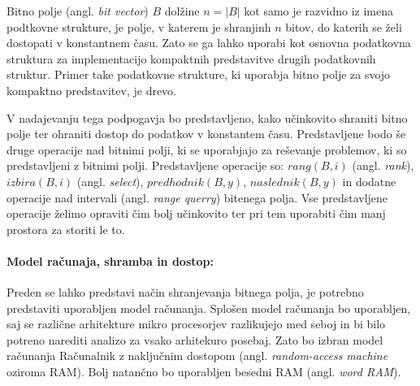 Bitno polje (angl. \textit{bit vector}) $B$ dolžine $n=|B|$ kot samo je razvidno iz imena podtkovne strukture, je polje, v katerem je shranjinh $n$ bitov, do katerih se želi dostopati v konstantnem času. Zato se ga lahko uporabi kot osnovna podatkovna struktura za implementacijo kompaktnih predstavitve drugih podatkovnih struktur. Primer take podatkovne strukture, ki uporabja bitno polje za svojo kompaktno predstavitev, je drevo.

V nadajevanju tega podpogavja bo predstavljeno, kako učinkovito shraniti bitno polje ter ohraniti dostop do podatkov v konstantem času. Predstavljene bodo še druge operacije nad bitnimi polji, ki se uporabjajo za reševanje problemov, ki so predstavljeni z bitnimi polji. Predstavljene operacije so: $rang(B,i)$ (angl. \textit{rank}), $izbira(B,i)$ (angl. \textit{select}), $predhodnik(B,y)$, $naslednik(B,y)$ in dodatne operacije nad intervali (angl. \textit{range querry}) bitenega polja. Vse predstavljene operacije želimo opraviti čim bolj učinkovito ter pri tem uporabiti čim manj prostora za storiti le to.

%

\paragraph{Model računaja, shramba in dostop:}
Preden se lahko predstavi način shranjevanja bitnega polja, je potrebno predstaviti uporabljen model računanja. Splošen model računanja bo uporabljen, saj se različne arhitekture mikro procesorjev razlikujejo med seboj in bi bilo potreno narediti analizo za vsako arhitekuro posebaj. Zato bo izbran model računanja Računalnik z naključnim dostopom (angl. \textit{random-access machine} oziroma RAM). Bolj natančno bo uporabljen besedni RAM  (angl. \textit{word RAM}).


